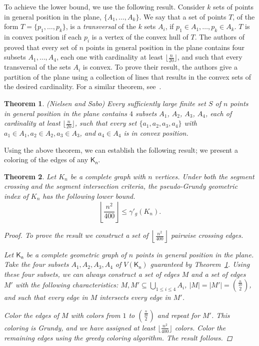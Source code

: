 \documentclass[11pt]{article}
\newtheorem{theorem}{Theorem}
\begin{document}
To achieve the lower bound, we use the following result. Consider $k$ sets of points in general position in the plane, $\{A_1, \ldots, A_k\}$. We say that a set of points $T$, of the form $T =\{p_1, \ldots, p_k\}$, is a \emph{transversal} of the $k$ sets $A_i$, if $p_1 \in A_1, \ldots, p_k \in A_k$. $T$ is in convex position if each $p_i$ is a vertex of the convex hull of $T$. The authors of~\cite{MR1755231} proved that every set of $n$ points in general position in the plane contains four subsets $A_1, \ldots, A_4$, each one with cardinality at least $\lfloor \frac{n}{20} \rfloor$, and such that every transversal of the sets $A_i$ is convex. To prove their result, the authors give a partition of the plane using a collection of lines that results in the convex sets of the desired cardinality. For a similar theorem, see~\cite{MR1608874}. 

\begin{theorem}\label{thm:traversal}(Nielsen and Sabo)
Every sufficiently large finite set $S$ of $n$ points in general position in the plane contains $4$ subsets $A_1$, $A_2$, $A_3$, $A_4$, each of cardinality at least $\lfloor \frac{n}{20}\rfloor$, such that every set $\{a_1, a_2, a_3, a_4\}$ with $a_1 \in A_1, a_2 \in A_2, a_3 \in A_3$, and $a_4 \in A_4$ is in convex position.
\end{theorem}

Using the above theorem, we can establish the following result; we present a coloring of the edges of any $\mathsf{K_n}$.

\begin{theorem}
Let $K_n$ be a complete graph with $n$ vertices. Under both the segment crossing and the segment intersection criteria, the pseudo-Grundy geometric index of $K_n$ has the following lower bound.
$$\left \lfloor \frac{n^2}{400} \right \rfloor \leq \gamma'_g({K_n}).$$

\begin{proof}
To prove the result we construct a set of $\left \lfloor \frac{n^2}{400} \right \rfloor$ pairwise crossing edges.

Let $\mathsf{K_n}$ be a complete geometric graph of $n$ points in general position in the plane. Take the four subsets $A_1, A_2, A_3, A_4$ of $V(\mathsf{K_n})$ guaranteed by Theorem~\ref{thm:traversal}. Using these four subsets, we can always construct a set of edges $M$ and a set of edges $M'$ with the following characteristics: $M, M' \subseteq \bigcup_{1\leq i \leq 4}A_i$, $|M| = |M'| = \binom{\frac{n}{20}}{2}$, and such that every edge in $M$ intersects every edge in $M'$. 

Color the edges of $M$ with colors from $1$ to $\binom{\frac{n}{20}}{2}$ and repeat for $M'$. This coloring is Grundy, and we have assigned at least $\lfloor \frac{n^2}{400}\rfloor$ colors. Color the remaining edges using the greedy coloring algorithm. The result follows. 
\end{proof}
\end{theorem}
\end{document}
